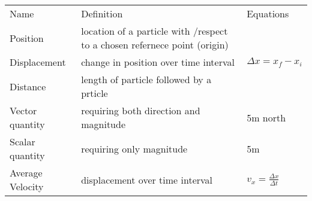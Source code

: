 \documentclass[11pt]{article}
\begin{document}
\begin{table}
	\begin{tabular}{l|ll}
		Name & Definition & Equations \\
		Position & location of a particle with \slash respect to a chosen refernece point (origin) & \\
		Displacement & change in position over time interval & $ \Delta x=x_{f} - x_{i} $ \\
		Distance & length of particle followed by a prticle & \\
		Vector quantity & requiring both direction and magnitude & 5m north \\
		Scalar quantity & requiring only magnitude & 5m \\
		Average Velocity & displacement over time interval & $ v_{x} = \frac{ \Delta x}{ \Delta t } $ \\
	\end{tabular}
\end{table}
\end{document}

